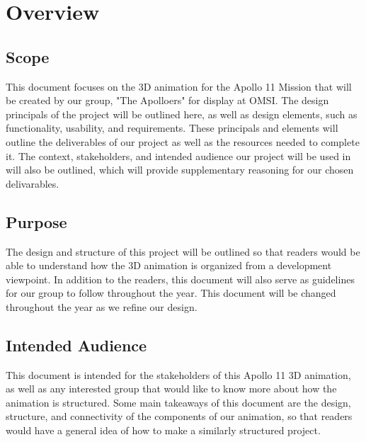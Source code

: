 \documentclass[onecolumn, draftclsnofoot,10pt, compsoc]{IEEEtran}
\begin{document}
\clearpage


\section{Overview}
       \subsection{Scope}
        This document focuses on the 3D animation for the Apollo 11 Mission that will be created by our group, "The Apolloers" for display at OMSI. The design principals of the project will be outlined here, as well as design elements, such as functionality, usability, and requirements. These principals and elements will outline the deliverables of our project as well as the resources needed to complete it. The context, stakeholders, and intended audience our project will be used in will also be outlined, which will provide supplementary reasoning for our chosen delivarables.  %
        
    \subsection{Purpose}
        The design and structure of this project will be outlined so that readers would be able to understand how the 3D animation is organized from a development viewpoint. In addition to the readers, this document will also serve as guidelines for our group to follow throughout the year. This document will be changed throughout the year as we refine our design. 

    \subsection{Intended Audience}
        This document is intended for the stakeholders of this Apollo 11 3D animation, as well as any interested group that would like to know more about how the animation is structured. Some main takeaways of this document are the design, structure, and connectivity of the components of our animation, so that readers would have a general idea of how to make a similarly structured project. 
\end{document}
